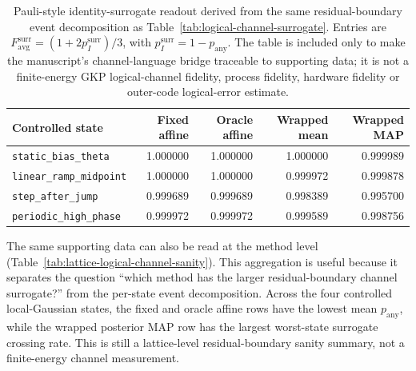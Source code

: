 \documentclass[11pt]{article}
\begin{document}
\begin{table}[t]
\centering
\small
\begin{tabular}{@{}lrrrr@{}}
\toprule
Controlled state & Fixed affine & Oracle affine & Wrapped mean & Wrapped MAP \\
\midrule
\texttt{static\_bias\_theta} & 1.000000 & 1.000000 & 1.000000 & 0.999989 \\
\texttt{linear\_ramp\_midpoint} & 1.000000 & 1.000000 & 0.999972 & 0.999878 \\
\texttt{step\_after\_jump} & 0.999689 & 0.999689 & 0.998389 & 0.995700 \\
\texttt{periodic\_high\_phase} & 0.999972 & 0.999972 & 0.999589 & 0.998756 \\
\bottomrule
\end{tabular}
\caption{Pauli-style identity-surrogate readout derived from the same
residual-boundary event decomposition as Table~\ref{tab:logical-channel-surrogate}.
Entries are \(F_{\mathrm{avg}}^{\mathrm{surr}}=(1+2p_I^{\mathrm{surr}})/3\),
with \(p_I^{\mathrm{surr}}=1-p_{\mathrm{any}}\).  The table is included only
to make the manuscript's channel-language bridge traceable to supporting data;
it is not a finite-energy GKP logical-channel fidelity, process fidelity,
hardware fidelity or outer-code logical-error estimate.}
\label{tab:logical-channel-fidelity-surrogate}
\end{table}

The same supporting data can also be read at the method level
(Table~\ref{tab:lattice-logical-channel-sanity}).  This aggregation is useful
because it separates the question ``which method has the larger
residual-boundary channel surrogate?'' from the per-state event decomposition.
Across the four controlled local-Gaussian states, the fixed and oracle affine
rows have the lowest mean \(p_{\mathrm{any}}\), while the wrapped posterior MAP
row has the largest worst-state surrogate crossing rate.  This is still a
lattice-level residual-boundary sanity summary, not a finite-energy channel
measurement.
\end{document}
